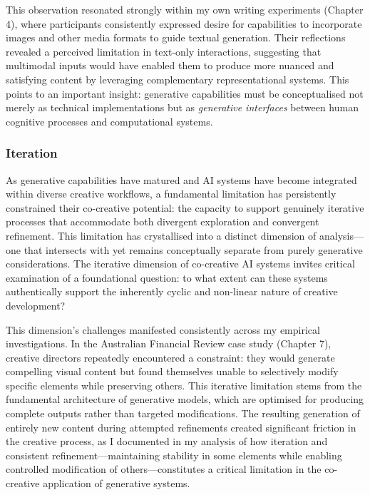 This observation resonated strongly within my own writing experiments (Chapter 4), where participants consistently expressed desire for capabilities to incorporate images and other media formats to guide textual generation. Their reflections revealed a perceived limitation in text-only interactions, suggesting that multimodal inputs would have enabled them to produce more nuanced and satisfying content by leveraging complementary representational systems. This points to an important insight: generative capabilities must be conceptualised not merely as technical implementations but as \textit{generative interfaces} between human cognitive processes and computational systems.

\subsubsection{Iteration}

As generative capabilities have matured and AI systems have become integrated within diverse creative workflows, a fundamental limitation has persistently constrained their co-creative potential: the capacity to support genuinely iterative processes that accommodate both divergent exploration and convergent refinement. This limitation has crystallised into a distinct dimension of analysis—one that intersects with yet remains conceptually separate from purely generative considerations. The iterative dimension of co-creative AI systems invites critical examination of a foundational question: to what extent can these systems authentically support the inherently cyclic and non-linear nature of creative development?

This dimension's challenges manifested consistently across my empirical investigations. In the Australian Financial Review case study (Chapter 7), creative directors repeatedly encountered a constraint: they would generate compelling visual content but found themselves unable to selectively modify specific elements while preserving others. This iterative limitation stems from the fundamental architecture of generative models, which are optimised for producing complete outputs rather than targeted modifications. The resulting generation of entirely new content during attempted refinements created significant friction in the creative process, as I documented in my analysis of how iteration and consistent refinement—maintaining stability in some elements while enabling controlled modification of others—constitutes a critical limitation in the co-creative application of generative systems.


